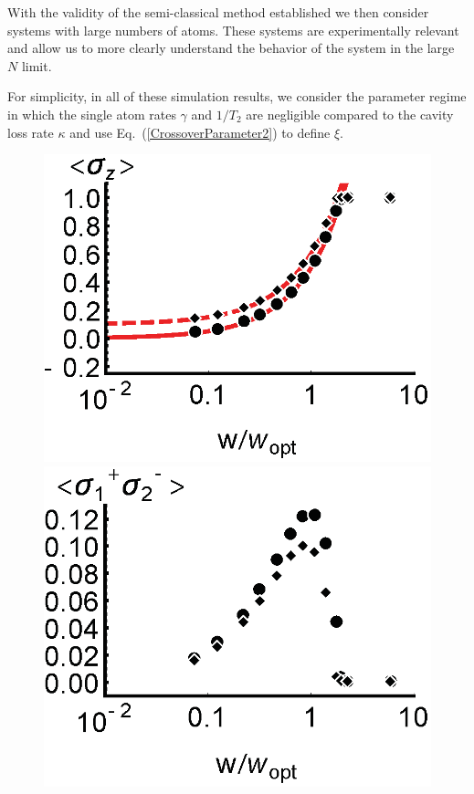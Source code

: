 \documentclass[aps,
twocolumn,
showpacs,
superscriptaddress,groupedaddress]{revtex4}
\begin{document}
With the validity of the semi-classical method established we then
consider systems with large numbers of atoms.  These systems are
experimentally relevant and allow us to more clearly understand the
behavior of the system in the large $N$ limit.

For simplicity, in all of these simulation results, we consider the
parameter regime in which the single atom rates $\gamma$ and $1/T_2$
are negligible compared to the cavity loss rate $\kappa$ and use
Eq.~(\ref{CrossoverParameter2}) to define $\xi$.

\begin{figure}
\begin{center}
	\includegraphics[scale =0.445] {N10000SZ.eps}
	\hspace{-5.0mm} \includegraphics[scale =0.445] {N10000SPSM.eps}

\end{center}
\end{figure}
\end{document}
